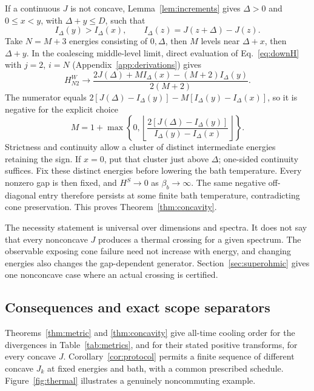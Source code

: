\documentclass[11pt,a4paper]{article}
\theoremstyle{remark}\newtheorem{remark}[theorem]{Remark}
\begin{document}
If a continuous $J$ is not concave, Lemma~\ref{lem:increments} gives $\Delta>0$ and $0\le x<y$, with $\Delta+y\le D$, such that
\begin{equation}
 I_\Delta(y)>I_\Delta(x),\qquad I_\Delta(z)=J(z+\Delta)-J(z).
 \label{eq:increment}
\end{equation}
Take $N=M+3$ energies consisting of $0,\Delta$, then $M$ levels near $\Delta+x$, then $\Delta+y$. In the coalescing middle-level limit, direct evaluation of Eq.~\eqref{eq:downH} with $j=2$, $i=N$ (Appendix~\ref{app:derivations}) gives
\begin{equation}
 H^W_{N2}\longrightarrow
 \frac{2J(\Delta)+M I_\Delta(x)-(M+2)I_\Delta(y)}{2(M+2)}.
 \label{eq:necessity}
\end{equation}
The numerator equals $2[J(\Delta)-I_\Delta(y)]-M[I_\Delta(y)-I_\Delta(x)]$, so it is negative for the explicit choice
\begin{equation}
 M=1+\max\left\{0,\left\lfloor\frac{2[J(\Delta)-I_\Delta(y)]}{I_\Delta(y)-I_\Delta(x)}\right\rfloor\right\}.
 \label{eq:Mchoice}
\end{equation}
Strictness and continuity allow a cluster of distinct intermediate energies retaining the sign. If $x=0$, put that cluster just above $\Delta$; one-sided continuity suffices. Fix these distinct energies before lowering the bath temperature. Every nonzero gap is then fixed, and $H^S\to0$ as $\beta_b\to\infty$. The same negative off-diagonal entry therefore persists at some finite bath temperature, contradicting cone preservation. This proves Theorem~\ref{thm:concavity}.

The necessity statement is universal over dimensions and spectra. It does not say that every nonconcave $J$ produces a thermal crossing for a given spectrum. The observable exposing cone failure need not increase with energy, and changing energies also changes the gap-dependent generator. Section~\ref{sec:superohmic} gives one nonconcave case where an actual crossing is certified.

\subsection{Consequences and exact scope separators}\label{sec:separators}
Theorems~\ref{thm:metric} and \ref{thm:concavity} give all-time cooling order for the divergences in Table~\ref{tab:metrics}, and for their stated positive transforms, for every concave $J$. Corollary~\ref{cor:protocol} permits a finite sequence of different concave $J_k$ at fixed energies and bath, with a common prescribed schedule. Figure~\ref{fig:thermal} illustrates a genuinely noncommuting example.
\end{document}
